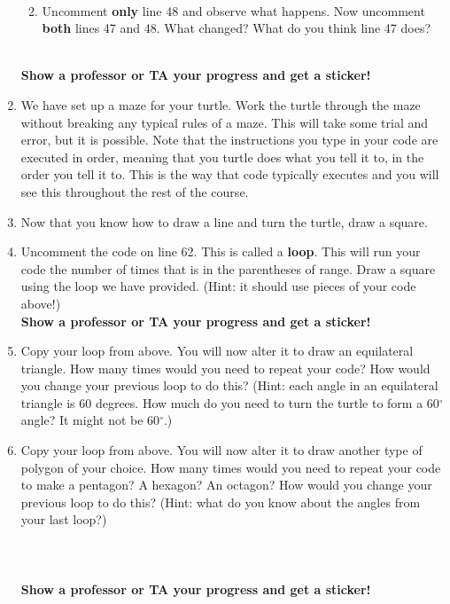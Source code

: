 \documentclass[11pt, letterpaper, onecolumn, oneside, final]{article}
\begin{document}
\begin{enumerate}
\begin{enumerate}
    \\
    \item Uncomment \textbf{only} line 48 and observe what happens. Now uncomment \textbf{both} lines 47 and 48. What changed? What do you think line 47 does?\\
    \\
\end{enumerate}
\textbf{Show a professor or TA your progress and get a sticker!}
\item We have set up a maze for your turtle. Work the turtle through the maze without breaking any typical rules of a maze. This will take some trial and error, but it is possible. Note that the instructions you type in your code are executed in order, meaning that you turtle does what you tell it to, in the order you tell it to. This is the way that code typically executes and you will see this throughout the rest of the course.

\item Now that you know how to draw a line and turn the turtle, draw a square.

\item Uncomment the code on line 62. This is called a \textbf{loop}. This will run your code the number of times that is in the parentheses of {\consolas range}. Draw a square using the loop we have provided. (Hint: it should use pieces of your code above!)\\
\textbf{Show a professor or TA your progress and get a sticker!}

\item Copy your loop from above. You will now alter it to draw an equilateral triangle. How many times would you need to repeat your code? How would you change your previous loop to do this? (Hint: each angle in an equilateral triangle is 60 degrees. How much do you need to turn the turtle to form a 60$^{\circ}$ angle? It might not be 60$^{\circ}$.)

\item Copy your loop from above. You will now alter it to draw another type of polygon of your choice. How many times would you need to repeat your code to make a pentagon? A hexagon? An octagon? How would you change your previous loop to do this? (Hint: what do you know about the angles from your last loop?)\\\\\\\\
\textbf{Show a professor or TA your progress and get a sticker!}


\end{enumerate}
\end{document}
